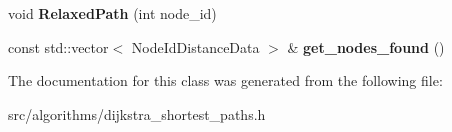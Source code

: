 \begin{DoxyCompactItemize}
\item 
\hypertarget{classall__distance__sketch_1_1CollectorNodesUpToTRank_a8b344e06904c1aa588da73d659eb752c}{}void {\bfseries Relaxed\+Path} (int node\+\_\+id)\label{classall__distance__sketch_1_1CollectorNodesUpToTRank_a8b344e06904c1aa588da73d659eb752c}

\item 
\hypertarget{classall__distance__sketch_1_1CollectorNodesUpToTRank_a33df9d6967e59158d7ec9f888ec9b1a7}{}const std\+::vector$<$ Node\+Id\+Distance\+Data $>$ \& {\bfseries get\+\_\+nodes\+\_\+found} ()\label{classall__distance__sketch_1_1CollectorNodesUpToTRank_a33df9d6967e59158d7ec9f888ec9b1a7}

\end{DoxyCompactItemize}


The documentation for this class was generated from the following file\+:\begin{DoxyCompactItemize}
\item 
src/algorithms/dijkstra\+\_\+shortest\+\_\+paths.\+h\end{DoxyCompactItemize}
